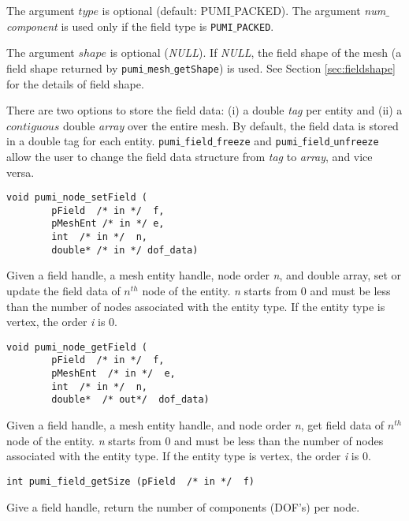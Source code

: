 The argument $type$ is optional (default: PUMI$\_$PACKED). The argument \emph{num$\_$component} is used only if the field type is \texttt{PUMI$\_$PACKED}. 

The argument $shape$ is optional (\emph{NULL}). If \emph{NULL}, the field shape of the mesh 
(a field shape returned by \texttt{pumi$\_$mesh$\_$getShape}) is used. See Section \ref{sec:fieldshape} for the details of field shape.

There are two options to store the field data: (i) a double \emph{tag} per entity and (ii) a $contiguous$ double \emph{array} over the entire mesh. By default, the field data is stored in a double tag for each entity. \texttt{pumi$\_$field$\_$freeze} and \texttt{pumi$\_$field$\_$unfreeze} allow the user to change the field data structure from \emph{tag} to \emph{array}, and vice versa.

\begin{verbatim}
void pumi_node_setField (
        pField  /* in */  f, 
        pMeshEnt /* in */ e, 
        int  /* in */  n,
        double* /* in */ dof_data)
\end{verbatim}\vspace{-.5cm}\hspace{1cm}
Given a field handle, a mesh entity handle, node order \emph{n}, and double array, set or update the field data of $n^{th}$ node of the entity. \emph{n} starts from $0$ and must be less than the number of nodes associated with the entity type. If the entity type is vertex, the order \emph{i} is $0$.

\begin{verbatim}
void pumi_node_getField (
        pField  /* in */  f, 
        pMeshEnt  /* in */  e, 
        int  /* in */  n,
        double*  /* out*/  dof_data)
\end{verbatim}\vspace{-.5cm}\hspace{1cm}
Given a field handle, a mesh entity handle, and node order \emph{n}, get field data of $n^{th}$ node of the entity. \emph{n} starts from $0$ and must be less than the number of nodes associated with the entity type. If the entity type is vertex, the order \emph{i} is $0$.

\begin{verbatim}
int pumi_field_getSize (pField  /* in */  f)
\end{verbatim}\vspace{-.5cm}\hspace{1cm}
Give a field handle, return the number of components (DOF's) per node.

